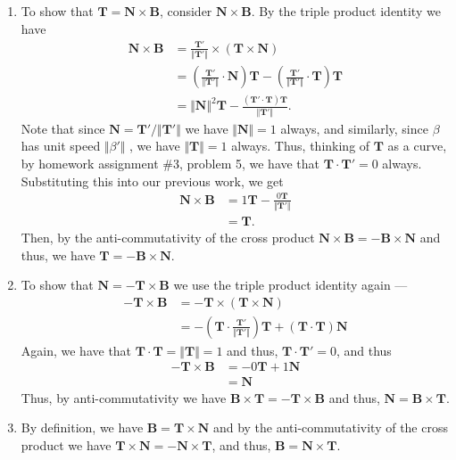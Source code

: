 \documentclass[12 pt, letterpaper]{hmcpset}
\begin{document}
\begin{solution}
	\begin{enumerate}
		\item To show that $\mathbf{T} = \mathbf{N} \times \mathbf{B}$, consider $\mathbf{N} \times \mathbf{B}$. By the triple product identity we have
			\[
				\begin{split}
					\mathbf{N} \times \mathbf{B} & = \frac{\mathbf{T}'}{\Vert \mathbf{T}' \Vert} \times (\mathbf{T} \times \mathbf{N}) \\
								     & = \left ( \frac{\mathbf{T}'}{\Vert \mathbf{T}' \Vert} \cdot \mathbf{N} \right ) \mathbf{T} - \left ( \frac{\mathbf{T}'}{\Vert \mathbf{T}' \Vert} \cdot \mathbf{T} \right ) \mathbf{T} \\
								     & = \Vert \mathbf{N} \Vert^{2} \mathbf{T} - \frac{(\mathbf{T}' \cdot \mathbf{T}) \mathbf{T}}{\Vert \mathbf{T}' \Vert}.
				\end{split}
			\]
		Note that since $\mathbf{N} = \mathbf{T}'/\Vert \mathbf{T}' \Vert$ we have $\Vert \mathbf{N} \Vert = 1$ always, and similarly, since $\beta$ has unit speed $\Vert \beta' \Vert$ , we have $\Vert \mathbf{T} \Vert = 1$  always. Thus, thinking of $\mathbf{T}$  as a curve, by homework assignment \#3, problem 5, we have that $\mathbf{T} \cdot \mathbf{T}' = 0$  always. Substituting this into our previous work, we get
		\[
			\begin{split}
				\mathbf{N} \times \mathbf{B} & = 1 \mathbf{T} - \frac{0 \mathbf{T}}{\Vert \mathbf{T}' \Vert} \\
							     & = \mathbf{T}.
			\end{split}
		\]
		Then, by the anti-commutativity of the cross product $\mathbf{N} \times \mathbf{B} = - \mathbf{B} \times \mathbf{N}$ and thus, we have $\mathbf{T} = - \mathbf{B} \times \mathbf{N}$.
		\item To show that $\mathbf{N} = - \mathbf{T} \times \mathbf{B}$ we use the triple product identity again ---
			\[
				\begin{split}
					- \mathbf{T} \times \mathbf{B} & = - \mathbf{T} \times (\mathbf{T} \times \mathbf{N}) \\
								     & = - \left ( \mathbf{T} \cdot \frac{\mathbf{T}'}{\Vert \mathbf{T}' \Vert} \right ) \mathbf{T} + \left ( \mathbf{T} \cdot \mathbf{T} \right ) \mathbf{N}
				\end{split}
			\]
			Again, we have that $\mathbf{T} \cdot \mathbf{T} = \Vert \mathbf{T} \Vert = 1$ and thus, $\mathbf{T} \cdot \mathbf{T}' = 0$, and thus
			\[
				\begin{split}
					- \mathbf{T} \times \mathbf{B} & = - 0 \mathbf{T} + 1 \mathbf{N} \\
								       & = \mathbf{N}
				\end{split}
			\]
			Thus, by anti-commutativity we have $\mathbf{B} \times \mathbf{T} = - \mathbf{T} \times \mathbf{B}$ and thus, $\mathbf{N} = \mathbf{B} \times \mathbf{T}$.
		\item By definition, we have $\mathbf{B} = \mathbf{T} \times \mathbf{N}$ and by the anti-commutativity of the cross product we have $\mathbf{T} \times \mathbf{N} = - \mathbf{N} \times \mathbf{T}$, and thus, $\mathbf{B} = \mathbf{N} \times \mathbf{T}$.
	\end{enumerate}
\end{solution}
\end{document}
